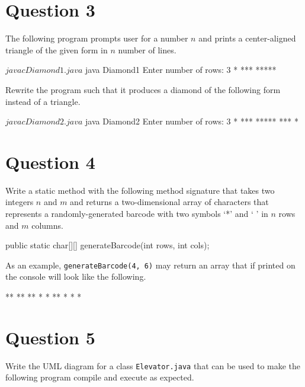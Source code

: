 \documentclass[12pt,letterpaper,twoside]{article}
\begin{document}
\section*{Question 3}

The following program prompts user for a number $n$ and prints a center-aligned triangle of the given form in $n$ number of lines.



\begin{terminal}
$ javac Diamond1.java
$ java Diamond1
Enter number of rows: 3
  *
 ***
*****
\end{terminal}

Rewrite the program such that it produces a diamond of the following form instead of a triangle.

\begin{terminal}
$ javac Diamond2.java
$ java Diamond2
Enter number of rows: 3
  *
 ***
*****
 ***
  *
\end{terminal}

\section*{Question 4}

Write a static method with the following method signature that takes two integers $n$ and $m$ and returns a two-dimensional array of characters that represents a randomly-generated barcode with two symbols `*' and ` ' in $n$ rows and $m$ columns.

\begin{terminal}
public static char[][] generateBarcode(int rows, int cols);
\end{terminal}

As an example, \texttt{generateBarcode(4, 6)} may return an array that if printed on the console will look like the following.

\begin{terminal}
 ** **
** *
* ** *
 *  *
\end{terminal}

\section*{Question 5}

Write the UML diagram for a class \texttt{Elevator.java} that can be used to make the following program compile and execute as expected.


\end{document}
